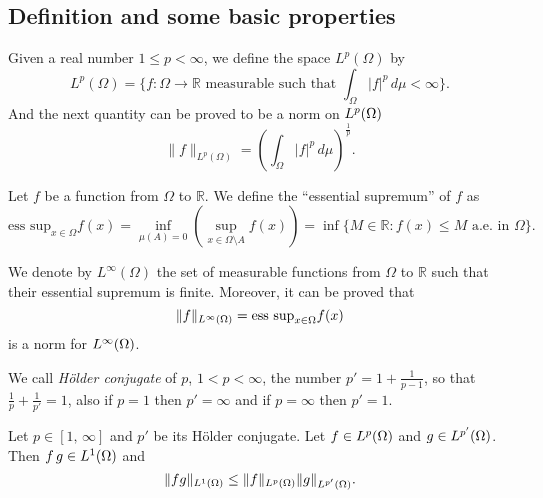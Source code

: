 \subsection*{Definition and some basic properties}
\begin{definition}
Given a real number $1\leq p < \infty$, we define the space $L^p(\Omega)$ by
$$L^p(\Omega)=\{f:\Omega \rightarrow \mathbb{R}\text{ measurable such that } \int_\Omega |f|^p\,d\mu <\infty\}.$$
And the next quantity can be proved to be a norm on ${L^{p}(\Omega)}$
$$\|f\|_{L^p(\Omega)} =\left(\int_\Omega |f|^p\,d\mu\right)^{\frac{1}{p}}.$$
\end{definition}
\begin{definition} Let $f$ be a function from $\Omega$ to $\mathbb{R}$. We define the ``essential supremum'' of $f$ as
$$\text{ess sup}_{x\in \Omega}f(x)=\inf_{\mu(A)=0}\left(\sup_{x\in \Omega\setminus A} f(x)\right)=\inf\{M\in\mathbb{R}:f(x)\leq M \text{ a.e. in }\Omega\}.$$
\end{definition}
\begin{definition}
We denote by $L^\infty(\Omega)$ the set of measurable functions from $\Omega$ to $\mathbb{R}$ such that their essential supremum is finite. Moreover, it can be proved that
$$\|f\|_{L^{\infty}(\Omega)}=\text{ess sup}_{x\in \Omega}f(x)$$
is a norm for ${L^{\infty}(\Omega)}$.
\end{definition}

We call \emph{H\"older conjugate} of $p$, $1< p<\infty$, the number $p'=1+\frac{1}{p-1}$, so that $\frac{1}{p}+\frac{1}{p'}=1$, also if $p=1$ then $p'=\infty$ and if $p=\infty$ then $p'=1$.

\begin{lemma} Let $p\in[1,\,\infty]$ and $p'$ be its H\"older conjugate. Let $f\in {L^{p}(\Omega)}$ and $g\in {L^{p'}(\Omega)}$. Then $f\,g\in {L^{1}(\Omega)}$ and
$$\|fg\|_{L^{1}(\Omega)}\leq \|f\|_{L^{p}(\Omega)}\|g\|_{L^{p'}(\Omega)}.$$
\end{lemma}

